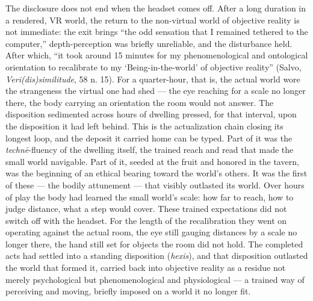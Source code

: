 \documentclass{article}
\begin{document}
The disclosure does not end when the headset comes off. After a long duration in a rendered, VR world, the return to the non-virtual world of objective reality is not immediate: the exit brings ``the odd sensation that I remained tethered to the computer,'' depth-perception was briefly unreliable, and the disturbance held. After which, ``it took around 15 minutes for my phenomenological and ontological orientation to recalibrate to my `Being-in-the-world' of objective reality'' (Salvo, \textit{Veri(dis)similitude}, 58 n. 15). For a quarter-hour, that is, the actual world wore the strangeness the virtual one had shed — the eye reaching for a scale no longer there, the body carrying an orientation the room would not answer. The disposition sedimented across hours of dwelling pressed, for that interval, upon the disposition it had left behind. This is the actualization chain closing its longest loop, and the deposit it carried home can be typed. Part of it was the \textit{technē}-fluency of the dwelling itself, the trained reach and read that made the small world navigable. Part of it, seeded at the fruit and honored in the tavern, was the beginning of an ethical bearing toward the world's others. It was the first of these — the bodily attunement — that visibly outlasted its world. Over hours of play the body had learned the small world's scale: how far to reach, how to judge distance, what a step would cover. These trained expectations did not switch off with the headset. For the length of the recalibration they went on operating against the actual room, the eye still gauging distances by a scale no longer there, the hand still set for objects the room did not hold. The completed acts had settled into a standing disposition (\textit{hexis}), and that disposition outlasted the world that formed it, carried back into objective reality as a residue not merely psychological but phenomenological and physiological — a trained way of perceiving and moving, briefly imposed on a world it no longer fit. 
\end{document}
